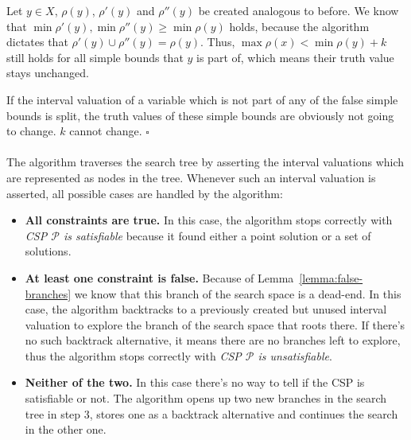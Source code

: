 Let $y \in X$, $\rho(y)$, $\rho'(y)$ and $\rho''(y)$ be created analogous to before.
We know that $\min \rho'(y), \min \rho''(y) \geq \min \rho(y)$ holds, because the algorithm dictates that $\rho'(y) \cup \rho''(y) = \rho(y)$.
Thus, $\max \rho(x) < \min \rho(y) + k$ still holds for all simple bounds that $y$ is part of, which means their truth value stays unchanged.

If the interval valuation of a variable which is not part of any of the false simple bounds is split, the truth values of these simple bounds are obviously not going to change. $k$ cannot change. $\square$



\paragraph{}
The algorithm traverses the search tree by asserting the interval valuations which are represented as nodes in the tree.
Whenever such an interval valuation is asserted, all possible cases are handled by the algorithm:

\begin{itemize}
    \item
        \textbf{All constraints are true.}
        In this case, the algorithm stops correctly with \emph{CSP $\mathcal{P}$ is satisfiable} because it found either a point solution or a set of solutions.
    
    \item
        \textbf{At least one constraint is false.}
        Because of Lemma~\ref{lemma:false-branches} we know that this branch of the search space is a dead-end.
        In this case, the algorithm backtracks to a previously created but unused interval valuation to explore the branch of the search space that roots there.
        If there's no such backtrack alternative, it means there are no branches left to explore, thus the algorithm stops correctly with \emph{CSP $\mathcal{P}$ is unsatisfiable}.
    \item
        \textbf{Neither of the two.}
        In this case there's no way to tell if the CSP is satisfiable or not.
        The algorithm opens up two new branches in the search tree in step 3, stores one as a backtrack alternative and continues the search in the other one.
\end{itemize}

